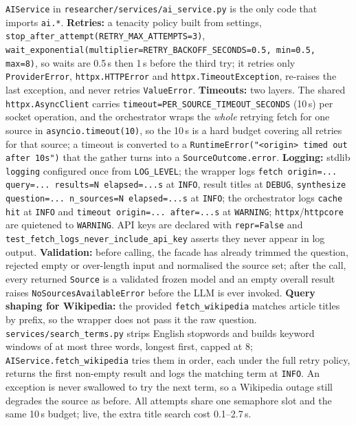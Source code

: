 \documentclass[11pt,a4paper]{article}
\begin{document}
\texttt{AIService} in \texttt{researcher/services/ai\_service.py} is the only code that imports \texttt{ai.*}. \textbf{Retries:} a tenacity policy built from settings, \texttt{stop\_after\_attempt(RETRY\_MAX\_ATTEMPTS=3)}, \texttt{wait\_exponential(multiplier=RETRY\_BACKOFF\_SECONDS=0.5, min=0.5, max=8)}, so waits are 0.5\,s then 1\,s before the third try; it retries only \texttt{ProviderError}, \texttt{httpx.HTTPError} and \texttt{httpx.TimeoutException}, re-raises the last exception, and never retries \texttt{ValueError}. \textbf{Timeouts:} two layers. The shared \texttt{httpx.AsyncClient} carries \texttt{timeout=PER\_SOURCE\_TIMEOUT\_SECONDS} (10\,s) per socket operation, and the orchestrator wraps the \emph{whole} retrying fetch for one source in \texttt{asyncio.timeout(10)}, so the 10\,s is a hard budget covering all retries for that source; a timeout is converted to a \texttt{RuntimeError("<origin> timed out after 10s")} that the gather turns into a \texttt{SourceOutcome.error}. \textbf{Logging:} stdlib \texttt{logging} configured once from \texttt{LOG\_LEVEL}; the wrapper logs \texttt{fetch origin=... query=... results=N elapsed=...s} at \texttt{INFO}, result titles at \texttt{DEBUG}, \texttt{synthesize question=... n\_sources=N elapsed=...s} at \texttt{INFO}; the orchestrator logs \texttt{cache hit} at \texttt{INFO} and \texttt{timeout origin=... after=...s} at \texttt{WARNING}; \texttt{httpx}/\texttt{httpcore} are quietened to \texttt{WARNING}. API keys are declared with \texttt{repr=False} and \texttt{test\_fetch\_logs\_never\_include\_api\_key} asserts they never appear in log output. \textbf{Validation:} before calling, the facade has already trimmed the question, rejected empty or over-length input and normalised the source set; after the call, every returned \texttt{Source} is a validated frozen model and an empty overall result raises \texttt{NoSourcesAvailableError} before the LLM is ever invoked. \textbf{Query shaping for Wikipedia:} the provided \texttt{fetch\_wikipedia} matches article titles by prefix, so the wrapper does not pass it the raw question. \texttt{services/search\_terms.py} strips English stopwords and builds keyword windows of at most three words, longest first, capped at 8; \texttt{AIService.fetch\_wikipedia} tries them in order, each under the full retry policy, returns the first non-empty result and logs the matching term at \texttt{INFO}. An exception is never swallowed to try the next term, so a Wikipedia outage still degrades the source as before. All attempts share one semaphore slot and the same 10\,s budget; live, the extra title search cost 0.1--2.7\,s.
\end{document}
